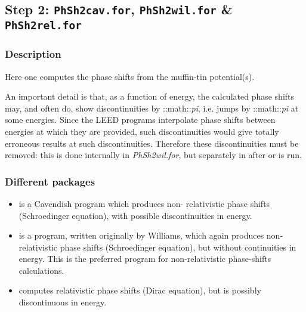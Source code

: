 \documentclass[letterpaper,10pt,english]{sphinxmanual}
\begin{document}
\subsection{Step 2: \texttt{PhSh2cav.for}, \texttt{PhSh2wil.for} \& \texttt{PhSh2rel.for}}
\label{phshift2007:step-2-phsh2cav-for-phsh2wil-for-phsh2rel-for}

\subsubsection{Description}
\label{phshift2007:id3}
Here one computes the phase shifts from the muffin-tin
potential(s).

An important detail is that, as a function of energy, the
calculated phase shifts may, and often do, show discontinuities
by ::math::\emph{pi}, i.e. jumps by ::math::\emph{pi} at some energies.
Since the LEED programs interpolate phase shifts between energies at which
they are provided, such discontinuities would give totally
erroneous results at such discontinuities. Therefore these
discontinuities must be removed: this is done internally
in \emph{PhSh2wil.for}, but separately in  after
 or  is run.


\subsubsection{Different packages}
\label{phshift2007:different-packages}\begin{itemize}
\item {} 
 is a Cavendish program which produces non-
relativistic phase shifts (Schroedinger equation), with
possible discontinuities in energy.

\item {} 
 is a program, written originally by Williams,
which again produces non-relativistic phase shifts
(Schroedinger equation), but without continuities in energy.
This is the preferred program for non-relativistic
phase-shifts calculations.

\item {} 
 computes relativistic phase shifts (Dirac
equation), but is possibly discontinuous in energy.

\end{itemize}
\end{document}
